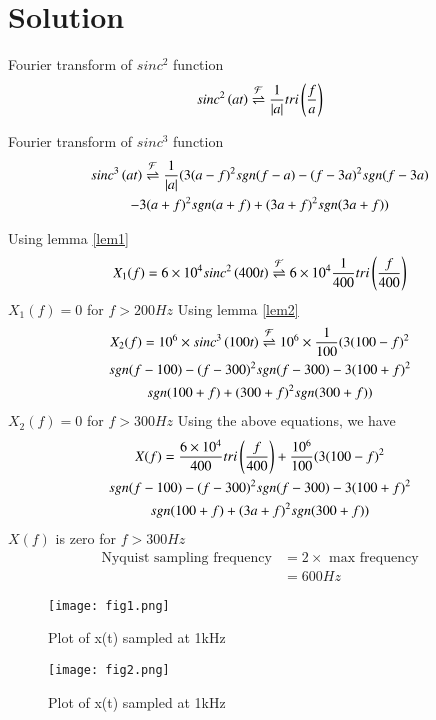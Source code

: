 \documentclass[journal,12pt,twocolumn]{IEEEtran}
\begin{document}
\section{Solution}
\begin{lemma}
\label{lem1}
Fourier transform of $sinc^{2}$ function 
\begin{align}
     sinc^{2}\left(at\right) \overset{\mathcal{F}}{ \rightleftharpoons} \frac{1}{|a|}tri\left(\frac{f}{a}\right)\label{ft}
\end{align}
\end{lemma}
\begin{lemma}
\label{lem2}
Fourier transform of $sinc^{3}$ function 
\begin{multline}
     sinc^{3}\left(at\right) \overset{\mathcal{F}}{ \rightleftharpoons} \frac{1}{|a|} (3(a-f)^{2}sgn(f-a)-(f-3a)^{2}sgn(f-3a)\\-3(a+f)^{2}sgn(a+f)+(3a+f)^{2}sgn(3a+f))
\end{multline}
\end{lemma}
Using lemma \ref{lem1} 
\begin{align}
     X_{1}(f)=6\times 10^{4}sinc^{2}\left(400t\right) \overset{\mathcal{F}}{ \rightleftharpoons} 6\times 10^{4}\frac{1}{400}tri\left(\frac{f}{400}\right)
\end{align}
$X_{1}(f)=0$ for $f>200Hz$
Using lemma \ref{lem2}
\begin{multline}
         X_{2}(f)=10^{6}\times sinc^{3}\left(100t\right) \overset{\mathcal{F}}{ \rightleftharpoons} 10^{6}\times\frac{1}{100} (3(100-f)^{2}\\sgn(f-100)-(f-300)^{2}sgn(f-300)-3(100+f)^{2}\\sgn(100+f)+(300+f)^{2}sgn(300+f))
\end{multline}
$X_{2}(f)=0$ for $f>300Hz$
Using the above equations, we have
\begin{multline}
    X(f) = \frac{6\times 10^{4}}{400}tri\left(\frac{f}{400}\right)+ \frac{10^{6}}{100}(3(100-f)^{2}\\sgn(f-100)-(f-300)^{2}sgn(f-300)-3(100+f)^{2}\\sgn(100+f)+(3a+f)^{2}sgn(300+f))
\end{multline}
$X(f)$ is zero for $f>300Hz$
\begin{align}
    \text{Nyquist sampling frequency}&=2\times \text{ max frequency}\\
                       &=600Hz
\end{align}

\begin{figure}[!h]
 \centering
 \texttt{[image: fig1.png]}
 \caption{Plot of x(t) sampled at 1kHz}
 \label{plot}
\end{figure}
\begin{figure}[!h]
 \centering
 \texttt{[image: fig2.png]}
 \caption{Plot of x(t) sampled at 1kHz}
 \label{plot}
\end{figure}
\end{document}
